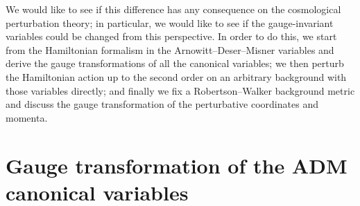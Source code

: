 \documentclass[a4paper,11pt]{article}
\begin{document}
We would like to see if this difference has any consequence on the cosmological 
perturbation theory; in particular, we would like to see if the gauge-invariant 
variables could be changed from this perspective. In order to do this, we start 
from the Hamiltonian formalism in the Arnowitt--Deser--Misner variables and 
derive the gauge transformations of all the canonical variables; we then perturb 
the Hamiltonian action up to the second order on an arbitrary background with 
those variables directly; and finally we fix a Robertson--Walker background 
metric and discuss the gauge transformation of the perturbative coordinates and 
momenta.

\section{Gauge transformation of the ADM canonical variables}

\end{document}
